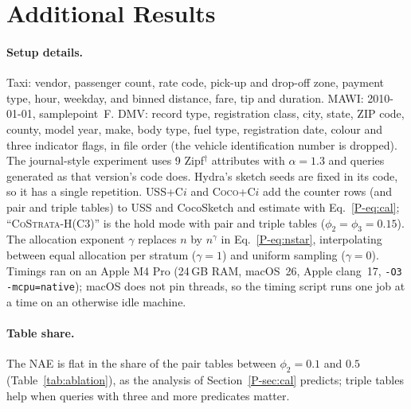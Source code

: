 \documentclass[sigconf,review,anonymous]{acmart}
\newcommand{\csh}{\textsc{CoStrata-H}\xspace}
\newcommand{\pref}[1]{\ref{P-#1}}
\begin{document}
\section{Additional Results}\label{app:more}

\begin{table}[t]
\centering\footnotesize\setlength{\tabcolsep}{3.5pt}
\caption{NAE by number of predicates $k$ at 10\,MB, record-sampled queries (mean of 5 seeds).}
\label{tab:byk}

\end{table}

\begin{table}[t]
\centering\footnotesize\setlength{\tabcolsep}{2.5pt}
\caption{Design space at 10\,MB (mean of 5 seeds): NAE on record-sampled queries with $k\ge2$, and
mean relative error of anchored queries whose rarest predicate occurs 10--99 and 100--999 times.}
\label{tab:ablation}

\end{table}

\paragraph{Setup details.} Taxi: vendor, passenger count, rate code, pick-up and drop-off zone, payment
type, hour, weekday, and binned distance, fare, tip and duration. MAWI: 2010-01-01, samplepoint~F.
DMV: record type, registration class, city, state, ZIP code, county, model year, make, body type, fuel type,
registration date, colour and three indicator flags, in file order (the vehicle identification number is
dropped). The journal-style experiment uses 9 Zipf$^\dagger$ attributes with $\alpha=1.3$ and queries
generated as that version's code does. Hydra's sketch seeds are fixed in its code, so it has a single
repetition. \textsc{USS+C$i$} and \textsc{Coco+C$i$} add the counter rows (and pair and triple tables)
to USS and CocoSketch and estimate with Eq.~\pref{eq:cal}; ``\csh (C3)'' is the hold mode with pair and
triple tables ($\phi_2=\phi_3=0.15$). The allocation exponent $\gamma$ replaces $n$ by $n^\gamma$ in
Eq.~\pref{eq:nstar}, interpolating between equal allocation per stratum ($\gamma=1$) and uniform
sampling ($\gamma=0$). Timings ran on an Apple M4 Pro (24\,GB RAM, macOS~26, Apple clang~17, \texttt{-O3 -mcpu=native}); macOS
does not pin threads, so the timing script runs one job at a time on an otherwise idle machine.

\paragraph{Table share.} The NAE is flat in the share of the pair tables between $\phi_2=0.1$ and $0.5$
(Table~\ref{tab:ablation}), as the analysis of Section~\pref{sec:cal} predicts; triple tables help when
queries with three and more predicates matter.
\end{document}

